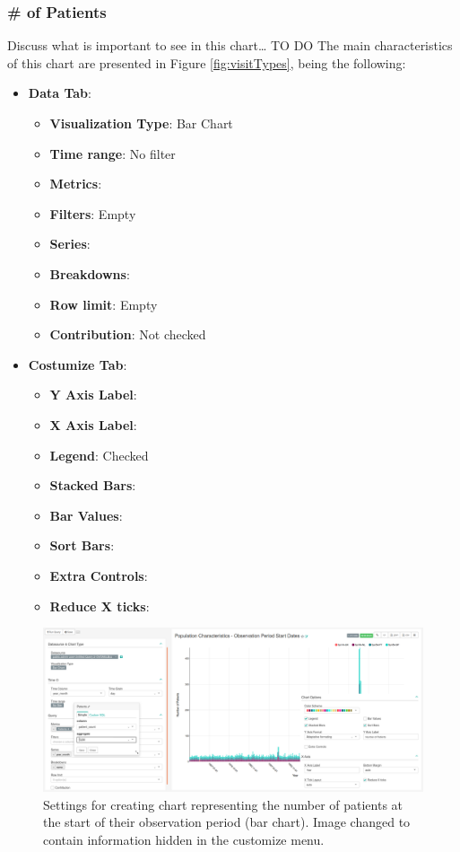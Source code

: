 \documentclass[]{book}
\providecommand{\tightlist}{%
  \setlength{\itemsep}{0pt}\setlength{\parskip}{0pt}}
\begin{document}
\subsubsection{\# of Patients}\label{of-patients}

Discuss what is important to see in this chart\ldots{} TO DO The main
characteristics of this chart are presented in Figure
\ref{fig:visitTypes}, being the following:

\begin{itemize}
\tightlist
\item
  \textbf{Data Tab}:

  \begin{itemize}
  \tightlist
  \item
    \textbf{Visualization Type}: Bar Chart
  \item
    \textbf{Time range}: No filter
  \item
    \textbf{Metrics}:
  \item
    \textbf{Filters}: Empty
  \item
    \textbf{Series}:
  \item
    \textbf{Breakdowns}:
  \item
    \textbf{Row limit}: Empty
  \item
    \textbf{Contribution}: Not checked
  \end{itemize}
\item
  \textbf{Costumize Tab}:

  \begin{itemize}
  \tightlist
  \item
    \textbf{Y Axis Label}:
  \item
    \textbf{X Axis Label}:
  \item
    \textbf{Legend}: Checked
  \item
    \textbf{Stacked Bars}:
  \item
    \textbf{Bar Values}:
  \item
    \textbf{Sort Bars}:
  \item
    \textbf{Extra Controls}:
  \item
    \textbf{Reduce X ticks}:
  \end{itemize}
\end{itemize}

\begin{figure}
\includegraphics[width=1\linewidth]{images/populationCharacteristicsObservationPeriodStartDates} \caption{Settings for creating chart representing the number of patients at the start of their observation period (bar chart). Image changed to contain information hidden in the customize menu.}\label{fig:visitTypes5}
\end{figure}
\end{document}
